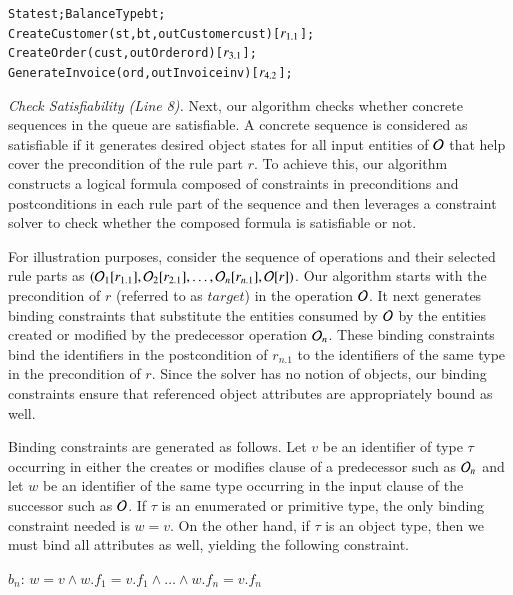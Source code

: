 \vspace*{-5pt}
{\small
\begin{alltt}
  State st; BalanceType bt;
  CreateCustomer(st, bt, out Customer cust) [\(r\sb{1.1}\)];
  CreateOrder(cust, out Order ord) [\(r\sb{3.1}\)];	
  GenerateInvoice(ord, out Invoice inv) [\(r\sb{4.2}\)];  
\end{alltt}
}
\vspace*{-5pt}

\textit{Check Satisfiability (Line 8).} Next, our algorithm checks whether 
concrete sequences in the queue are satisfiable. A concrete sequence 
is considered as satisfiable if it generates desired
object states for all input entities of ${\cal O}$ that help cover the precondition of the rule
part $r$. To achieve this, our algorithm constructs a logical formula composed
of constraints in preconditions and postconditions in each rule part of the sequence
and then leverages a constraint solver to check whether the composed
formula is satisfiable or not.

For illustration purposes, consider the sequence of operations and their selected
rule parts as $({\cal O}_1 [r_{1.1}], {\cal O}_2 [r_{2.1}], \ldots, {\cal O}_n [r_{n.1}], {\cal O} [r])$.
Our algorithm starts with the precondition of $r$ (referred to as $target$) in the operation ${\cal O}$. 
It next generates binding constraints that substitute the entities
consumed by ${\cal O}$ by the entities created or
modified by the predecessor operation ${\cal O}_n$. These binding constraints bind 
the identifiers in the postcondition of $r_{n.1}$ to the identifiers of the same type
in the precondition of $r$. Since the solver has no
notion of objects, our binding constraints ensure that referenced object attributes
are appropriately bound as well.

Binding constraints are generated as follows. Let $v$ be an
identifier of type $\tau$ occurring in either the creates or modifies
clause of a predecessor such as ${\cal O}_n$ and let $w$ be an identifier of the same type
occurring in the input clause of the successor such as ${\cal O}$. If $\tau$ is an enumerated or primitive type,
the only binding constraint needed is $w = v$. On the other hand, if $\tau$ is an object type, then
we must bind all attributes as well, yielding the following constraint.

$b_n$: $w = v \wedge w.f_1 = v.f_1 \wedge \ldots \wedge w.f_n = v.f_n$ 

